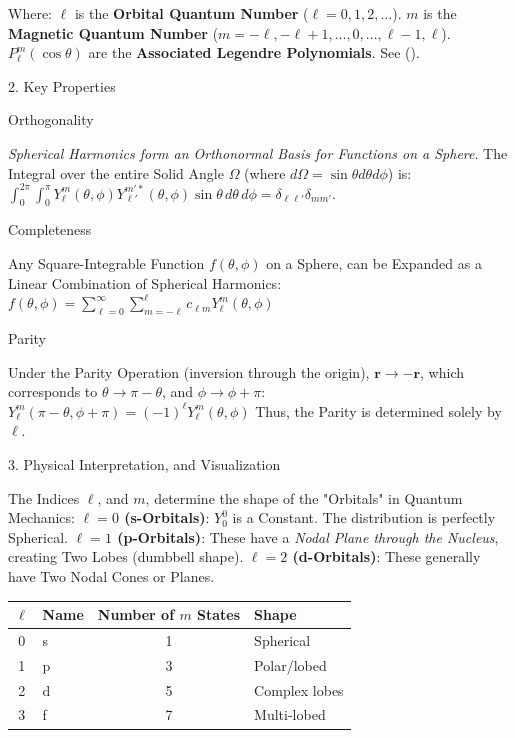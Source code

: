 \documentclass[a4paper, 10pt, onepage]{elegantbook}
\begin{document}
{Where:  
  $\ell$ is the \textbf{Orbital Quantum Number} ($\ell = 0, 1, 2, \dots$).  
  $m$ is the \textbf{Magnetic Quantum Number} ($m = -\ell, -\ell+1, \dots, 0, \dots, \ell-1, \ell$).  
  $P_\ell^m(\cos \theta)$ are the \textbf{Associated Legendre Polynomials}. See (\pageref{ssec:Legendre Polynomials}).  



    2. Key Properties  

\noindent

     Orthogonality  

\emph{Spherical Harmonics form an Orthonormal Basis for Functions on a Sphere}. The Integral over the entire Solid 
Angle $\Omega$ (where $d\Omega = \sin\theta d\theta d\phi$) is:  
$ \int_0^{2\pi} \int_0^\pi Y_\ell^m(\theta, \phi) Y_{\ell'}^{m' *}(\theta, \phi) \sin\theta \, d\theta \, d\phi = 
\delta_{\ell\ell'} \delta_{mm'} $.  

    Completeness  

\noindent

Any Square-Integrable Function $f(\theta, \phi)$ on a Sphere, can be Expanded as a Linear Combination of Spherical 
Harmonics:  
$ f(\theta, \phi) = \sum_{\ell=0}^\infty \sum_{m=-\ell}^\ell c_{\ell m} Y_\ell^m(\theta, \phi) $  

     Parity  

\noindent

Under the Parity Operation (inversion through the origin), $\mathbf{r} \to -\mathbf{r}$, which corresponds to $\theta 
\to \pi - \theta$, and $\phi \to \phi + \pi$:  
$ Y_\ell^m(\pi - \theta, \phi + \pi) = (-1)^\ell Y_\ell^m(\theta, \phi) $  
Thus, the Parity is determined solely by $\ell$.  

    3. Physical Interpretation, and Visualization  

\noindent

The Indices $\ell$, and $m$, determine the shape of the "Orbitals" in Quantum Mechanics:  
  \textbf{$\ell=0$ (s-Orbitals)}: $Y_0^0$ is a Constant. The distribution is perfectly Spherical.  
  \textbf{$\ell=1$ (p-Orbitals)}: These have a \emph{Nodal Plane through the Nucleus}, creating Two Lobes (dumbbell 
shape).  
  \textbf{$\ell=2$ (d-Orbitals)}: These generally have Two Nodal Cones or Planes.  

\begin{table}[ht]
\centering
\begin{tabular}{c l c l}
\toprule
$\ell$ & \textbf{Name} & \textbf{Number of $m$ States} & \textbf{Shape} \\
\midrule
0 & s & 1 & Spherical \\
1 & p & 3 & Polar/lobed \\
2 & d & 5 & Complex lobes \\
3 & f & 7 & Multi-lobed \\
\bottomrule
\end{tabular}
\end{table}

}
\end{document}
